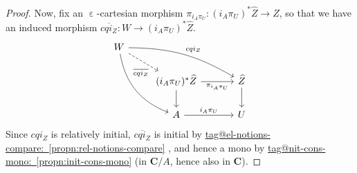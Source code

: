 \documentclass{amsart}
\makeatletter
\newcommand\bC{\mathbf{C}}
\newcommand\ein{\mathrel{\varepsilon}}
\newcommand\ol[1]{\overline{#1}}
\newcommand\unein{{\ein}}
\newcommand\wh[1]{\widehat{#1}}
\newcommand\tagword[1]{\csname tag@#1\endcsname}
\def\label@tag#1:#2\@nil{#1}
\newcommand\labeltag[1]{\label@tag#1:\@nil}
\newcommand\jref[1]{%
  \texorpdfstring%
    {\hyperref[#1]{\tagword{\labeltag{#1}}~\ref*{#1}}}%
    {\tagword{\labeltag{#1}}~\ref*{#1}}%
}
\theoremstyle{definition}
\theoremstyle{remark}
\theoremstyle{plainwithref}
\makeatother
\begin{document}
\begin{proof}
  Now, fix an \( \unein \)-cartesian morphism \( \pi_{i_A \pi_U} \colon (i_A \pi_U)^* \wh Z \to \wh Z \), so that we have an induced morphism \( \ol{c q i_Z} \colon W \to (i_A \pi_U)^* \wh Z \).
  \[
    \begin{tikzcd}
      W \ar[rrd, bend left=15pt, "c q i_Z"] \ar[rdd, bend right] \ar[rd, "\ol{c q i_Z}"', dashed, near end] \\
      & (i_A \pi_U)^* \wh Z \ar[r, "\pi_{i_A \pi_U}"'] \ar[d, ""'] &[10pt] \wh Z \ar[d, ""] \\
      & A \ar[r, "i_A \pi_U"] & U
    \end{tikzcd}
  \]
  Since \( c q i_Z \) is relatively initial, \( \ol{c q i_Z} \) is initial by  \jref{propn:rel-notions-compare}, and hence a mono by \jref{propn:init-cons-mono} (in \( \bC / A \), hence also in \( \bC \)).


\end{proof}
\end{document}

